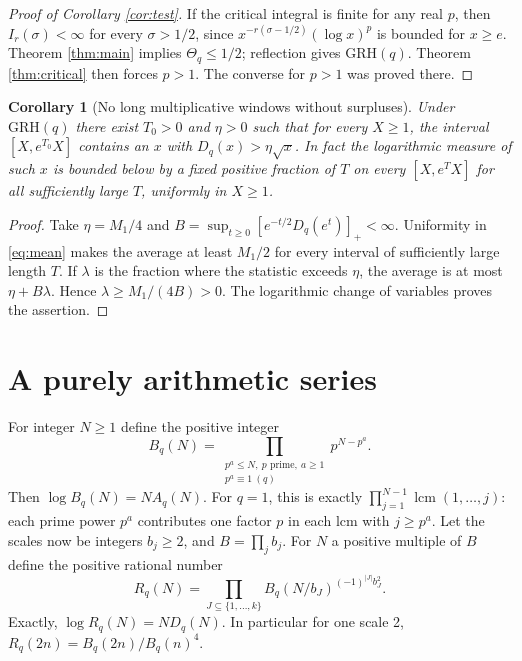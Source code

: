 \documentclass[11pt]{article}
\newtheorem{corollary}[theorem]{Corollary}
\newcommand{\pp}[1]{[#1]_+}
\newcommand{\GRH}{\mathrm{GRH}}
\begin{document}
\begin{proof}[Proof of Corollary \ref{cor:test}]
If the critical integral is finite for any real $p$, then $I_r(\sigma)<\infty$ for every $\sigma>1/2$, since $x^{-r(\sigma-1/2)}(\log x)^p$ is bounded for $x\ge e$. Theorem \ref{thm:main} implies $\Theta_q\le1/2$; reflection gives $\GRH(q)$. Theorem \ref{thm:critical} then forces $p>1$. The converse for $p>1$ was proved there.
\end{proof}

\begin{corollary}[No long multiplicative windows without surpluses]\label{cor:window}
Under $\GRH(q)$ there exist $T_0>0$ and $\eta>0$ such that for every $X\ge1$, the interval $[X,e^{T_0}X]$ contains an $x$ with $D_q(x)>\eta\sqrt{x}$. In fact the logarithmic measure of such $x$ is bounded below by a fixed positive fraction of $T$ on every $[X,e^T X]$ for all sufficiently large $T$, uniformly in $X\ge1$.
\end{corollary}
\begin{proof}
Take $\eta=M_1/4$ and $B=\sup_{t\ge0}\pp{e^{-t/2}D_q(e^t)}<\infty$. Uniformity in \eqref{eq:mean} makes the average at least $M_1/2$ for every interval of sufficiently large length $T$. If $\lambda$ is the fraction where the statistic exceeds $\eta$, the average is at most $\eta+B\lambda$. Hence $\lambda\ge M_1/(4B)>0$. The logarithmic change of variables proves the assertion.
\end{proof}

\section{A purely arithmetic series}
For integer $N\ge1$ define the positive integer
\begin{equation}\label{eq:B}
 B_q(N)=\prod_{\substack{p^a\le N,\ p\text{ prime},\ a\ge1\\p^a\equiv1\ (q)}}p^{N-p^a}.
\end{equation}
Then $\log B_q(N)=N A_q(N)$. For $q=1$, this is exactly $\prod_{j=1}^{N-1}\operatorname{lcm}(1,\ldots,j)$: each prime power $p^a$ contributes one factor $p$ in each lcm with $j\ge p^a$. Let the scales now be integers $b_j\ge2$, and $B=\prod_j b_j$. For $N$ a positive multiple of $B$ define the positive rational number
\begin{equation}\label{eq:R}
 R_q(N)=\prod_{J\subseteq\{1,\ldots,k\}}B_q(N/b_J)^{(-1)^{|J|}b_J^2}.
\end{equation}
Exactly, $\log R_q(N)=N D_q(N)$. In particular for one scale 2, $R_q(2n)=B_q(2n)/B_q(n)^4$.
\end{document}
